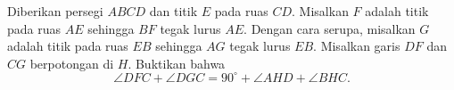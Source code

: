 Diberikan persegi \(ABCD\) dan titik \(E\) pada ruas \(CD\). Misalkan \(F\) adalah titik pada ruas \(AE\) sehingga \(BF\) tegak lurus \(AE\). Dengan cara serupa, misalkan \(G\) adalah titik pada ruas \(EB\) sehingga \(AG\) tegak lurus \(EB\). Misalkan garis \(DF\) dan \(CG\) berpotongan di \(H\). Buktikan bahwa
\[
\angle DFC + \angle DGC = 90^\circ + \angle AHD + \angle BHC.
\]